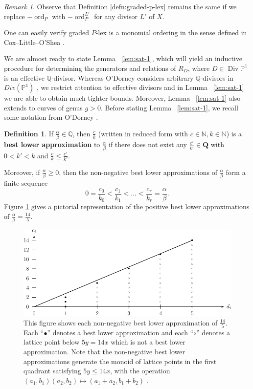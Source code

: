 \documentclass{amsart}
\theoremstyle{plain}
\theoremstyle{definition}
\newtheorem{defn}[thm]{Definition}
\theoremstyle{remark}
\newtheorem{rem}[thm]{Remark}
\numberwithin{equation}{section}
\newcommand\BN{{\mathbb N}}
\newcommand\BQ{{\mathbb Q}}
\newcommand\BP{{\mathbb P}}
\DeclareMathOperator{\ord}{ord}
\DeclareMathOperator\di{Div}
\newcommand{\halfcan}{L}
\begin{document}
\begin{rem}\label{rem:graded-P-lex-independent-of-line-bundle}
Observe that Definition \ref{defn:graded-p-lex} remains the same if we replace $-\ord_P$ with $-\ord_P^{L'}$ for any divisor $\halfcan'$ of $X$.
\end{rem}

\noindent One can easily verify graded $P$-lex is a monomial ordering in the sense defined in Cox--Little--O'Shea \cite[Chapter 2, $\mathsection$ 2, Definition 1]{cls:ideals-varieties-algorithms}.

We are almost ready to state Lemma ~\ref{lem:sat-1}, which will yield an inductive procedure for determining the generators and relations of $R_D$, where $D \in \di \BP^1$ is an effective $
\BQ$-divisor. Whereas O'Dorney considers arbitrary $\BQ$-divisors in $Div(\mathbb{P}^1)$ \cite[Theorem 8]{dorney:canonical}, we restrict attention to effective divisors and in Lemma ~\ref{lem:sat-1} we are able to obtain much tighter bounds.  Moreover, Lemma ~\ref{lem:sat-1} also extends to curves of genus $g > 0$. Before stating Lemma ~\ref{lem:sat-1}, we recall some notation from O'Dorney \cite{dorney:canonical}.

\begin{defn}\label{den:lower-approximation}
If $\frac{\alpha}{\beta}\in \BQ$, then $\frac{c}{k}$ (written in reduced form with $c \in \BN, k \in \BN$) is a {\bf{best lower approximation}} to $\frac{\alpha}{\beta}$ if there does not exist any $\frac{c'}{k'}\in \mathbf{Q}$ with $0<k'<k$ and $\frac{c}{k}\le \frac{c'}{k'}$. 
\end{defn}
Moreover, if $\frac{\alpha}{\beta}\ge 0$, then the non-negative best lower approximations of $\frac{\alpha}{\beta}$ form a finite sequence
\[
	0=\frac{c_0}{k_0} < \frac{c_1}{k_1} < \ldots < \frac{c_r}{k_r} = \frac{\alpha}{\beta}.
\]
Figure \ref{fig:s14/5-lattice} gives a pictorial representation of the positive best lower approximations of $\frac{\alpha}{\beta}=\frac{14}{5}$.

\begin{figure}
\includegraphics{pics/spin-lower-approximations-pic-pics.pdf}
\caption{This figure shows each non-negative best lower approximation of $\frac{14}{5}.$ Each ``$\bullet$'' denotes a best lower approximation and each ``$\circ$'' denotes a lattice point below $5y=14x$ which is not a best lower approximation.  Note that the non-negative best lower approximations generate the monoid of lattice points in the first quadrant satisfying  $5y \le 14x$, with the operation $(a_1, b_1)(a_2, b_2)\mapsto (a_1 + a_2, b_1 + b_2)$ .}\label{fig:s14/5-lattice}
\end{figure}
\end{document}
